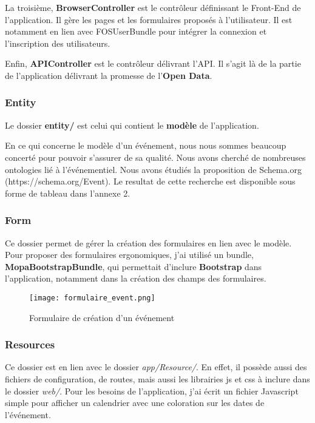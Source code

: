 La troisième, \textbf{BrowserController} est le contrôleur définissant le Front-End de l'application. Il gère les pages et les formulaires proposés à l'utilisateur. Il est notamment en lien avec FOSUserBundle pour intégrer la connexion et l'inscription des utilisateurs.

Enfin, \textbf{APIController} est le contrôleur délivrant l'API. Il s'agit là de la partie de l'application délivrant la promesse de l'\textbf{Open Data}.

\subsubsection*{Entity}

Le dossier \textbf{entity/} est celui qui contient le \textbf{modèle} de l'application.

En ce qui concerne le modèle d'un événement, nous nous sommes beaucoup concerté pour pouvoir s'assurer de sa qualité. Nous avons cherché de nombreuses ontologies lié à l'événementiel. Nous avons étudiés la proposition de Schema.org (https://schema.org/Event). Le resultat de cette recherche est disponible sous forme de tableau dans l'annexe 2.

\subsubsection*{Form}

Ce dossier permet de gérer la création des formulaires en lien avec le modèle. Pour proposer des formulaires ergonomiques, j'ai utilisé un bundle, \textbf{MopaBootstrapBundle}, qui permettait d'inclure \textbf{Bootstrap} dans l'application, notamment dans la création des champs des formulaires.

\begin{figure}[H]
\begin{center}
\texttt{[image: formulaire\_event.png]}
\end{center}
\caption{Formulaire de création d'un événement}
\end{figure}

\subsubsection*{Resources}

Ce dossier est en lien avec le dossier \textit{app/Resource/}. En effet, il possède aussi des fichiers de configuration, de routes, mais aussi les librairies js et css à inclure dans le dossier \textit{web/}. Pour les besoins de l'application, j'ai écrit un fichier Javascript simple pour afficher un calendrier avec une coloration sur les dates de l'événement.

